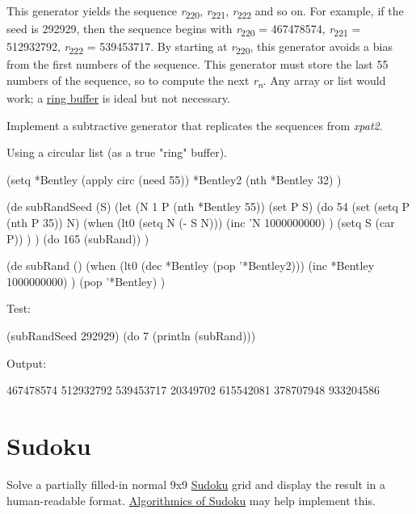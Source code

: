 \begin{itemize}
This generator yields the sequence \emph{r}\textsubscript{220},
\emph{r}\textsubscript{221}, \emph{r}\textsubscript{222} and so on. For
example, if the seed is 292929, then the sequence begins with
\emph{r}\textsubscript{220} = 467478574, \emph{r}\textsubscript{221} =
512932792, \emph{r}\textsubscript{222} = 539453717. By starting at
\emph{r}\textsubscript{220}, this generator avoids a bias from the first
numbers of the sequence. This generator must store the last 55 numbers
of the sequence, so to compute the next
\emph{r}\textsubscript{\emph{n}}. Any array or list would work; a
\href{/mw/index.php?title=Ring\_buffer\&action=edit\&redlink=1}{ring
buffer} is ideal but not necessary.

Implement a subtractive generator that replicates the sequences from
\emph{xpat2}.



\begin{wideverbatim}

Using a circular list (as a true "ring" buffer).

(setq
   *Bentley (apply circ (need 55))
   *Bentley2 (nth *Bentley 32) )

(de subRandSeed (S)
   (let (N 1  P (nth *Bentley 55))
      (set P S)
      (do 54
         (set (setq P (nth P 35)) N)
         (when (lt0 (setq N (- S N)))
            (inc 'N 1000000000) )
         (setq S (car P)) ) )
   (do 165 (subRand)) )

(de subRand ()
   (when (lt0 (dec *Bentley (pop '*Bentley2)))
      (inc *Bentley 1000000000) )
   (pop '*Bentley) )

Test:

(subRandSeed 292929)
(do 7 (println (subRand)))

Output:

467478574
512932792
539453717
20349702
615542081
378707948
933204586

\end{wideverbatim}

\pagebreak{}
\section*{Sudoku}

Solve a partially filled-in normal 9x9
\href{http://en.wikipedia.org/wiki/Sudoku}{Sudoku} grid and display the
result in a human-readable format.
\href{http://en.wikipedia.org/wiki/Algorithmics\_of\_sudoku}{Algorithmics
of Sudoku} may help implement this.

\begin{wideverbatim}


\end{wideverbatim}
\end{itemize}
